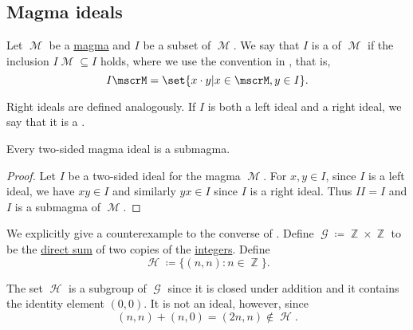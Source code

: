 \subsection{Magma ideals}\label{sec:magma_ideals}

\begin{definition}\label{def:magma_ideal}
  Let \( \mscrM \) be a \hyperref[def:magma]{magma} and \( I \) be a subset of \( \mscrM \). We say that \( I \) is a  of \( \mscrM \) if the inclusion \( I\mscrM \subseteq I \) holds, where we use the convention in , that is,
  \begin{equation*}
    I \mscrM = \set{ x \cdot y | x \in \mscrM, y \in I }.
  \end{equation*}

  Right ideals are defined analogously. If \( I \) is both a left ideal and a right ideal, we say that it is a .
\end{definition}

\begin{proposition}\label{thm:magma_ideal_is_submagma}
  Every two-sided magma ideal is a submagma.
\end{proposition}
\begin{proof}
  Let \( I \) be a two-sided ideal for the magma \( \mscrM \). For \( x, y \in I \), since \( I \) is a left ideal, we have \( xy \in I \) and similarly \( yx \in I \) since \( I \) is a right ideal. Thus \( II = I \) and \( I \) is a submagma of \( \mscrM \).
\end{proof}

\begin{example}\label{ex:subgroup_is_not_ideal}
  We explicitly give a counterexample to the converse of . Define \( \mscrG \coloneqq \BbbZ \times \BbbZ \) to be the \hyperref[def:group_direct_sum]{direct sum} of two copies of the \hyperref[def:integers]{integers}. Define
  \begin{equation*}
    \mscrH \coloneqq \{ (n, n) \colon n \in \BbbZ \}.
  \end{equation*}

  The set \( \mscrH \) is a subgroup of \( \mscrG \) since it is closed under addition and it contains the identity element \( (0, 0) \). It is not an ideal, however, since
  \begin{equation*}
    (n, n) + (n, 0) = (2n, n) \not\in \mscrH.
  \end{equation*}
\end{example}

